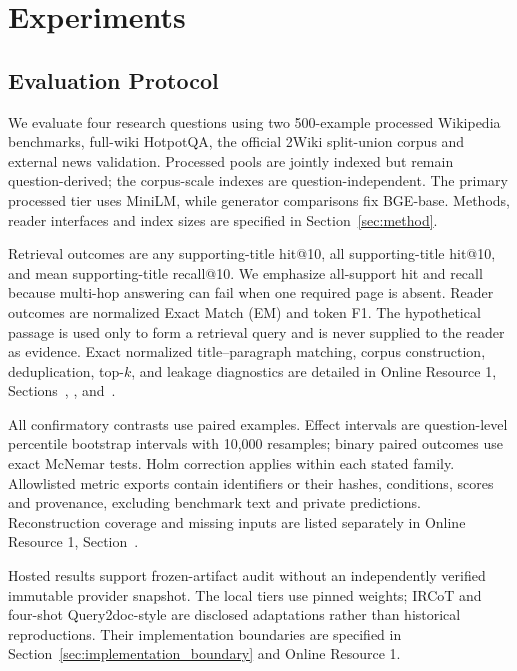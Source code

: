 \section{Experiments}
\label{sec:experiments}

\subsection{Evaluation Protocol}
\label{sec:dataset_setting}

We evaluate four research questions using two 500-example processed Wikipedia benchmarks, full-wiki HotpotQA, the official 2Wiki split-union corpus and external news validation. Processed pools are jointly indexed but remain question-derived; the corpus-scale indexes are question-independent. The primary processed tier uses MiniLM, while generator comparisons fix BGE-base. Methods, reader interfaces and index sizes are specified in Section~\ref{sec:method}.

Retrieval outcomes are any supporting-title hit@10, all supporting-title hit@10, and mean supporting-title recall@10. We emphasize all-support hit and recall because multi-hop answering can fail when one required page is absent. Reader outcomes are normalized Exact Match (EM) and token F1. The hypothetical passage is used only to form a retrieval query and is never supplied to the reader as evidence. Exact normalized title--paragraph matching, corpus construction, deduplication, top-$k$, and leakage diagnostics are detailed in Online Resource 1, Sections~, ,  and~.

All confirmatory contrasts use paired examples. Effect intervals are question-level percentile bootstrap intervals with 10,000 resamples; binary paired outcomes use exact McNemar tests. Holm correction applies within each stated family. Allowlisted metric exports contain identifiers or their hashes, conditions, scores and provenance, excluding benchmark text and private predictions. Reconstruction coverage and missing inputs are listed separately in Online Resource 1, Section~.

Hosted results support frozen-artifact audit without an independently verified immutable provider snapshot. The local tiers use pinned weights; IRCoT and four-shot Query2doc-style are disclosed adaptations rather than historical reproductions. Their implementation boundaries are specified in Section~\ref{sec:implementation_boundary} and Online Resource 1.

